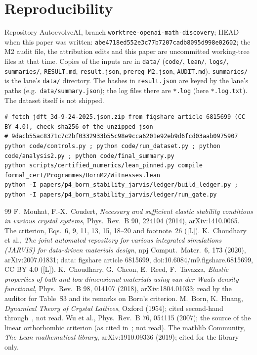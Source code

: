 \documentclass[10pt]{article}
\newcommand{\tier}[1]{\textsf{[#1]}}
\newcommand{\tL}{\tier{L}}
\begin{document}
\section{Reproducibility}\label{sec:repro}
Repository AutoevolveAI, branch \texttt{worktree-openai-math-discovery}; HEAD when this paper was written: \texttt{abe4718ed552e3c77b7207cadb8095d998e02602}; the M2 audit file, the attribution edits and this paper are uncommitted working-tree files at that time. Copies of the inputs are in \texttt{data/} (\texttt{code/}, \texttt{lean/}, \texttt{logs/}, \texttt{summaries/}, \texttt{RESULT.md}, \texttt{result.json}, \texttt{prereg\_M2.json}, \texttt{AUDIT.md}). \texttt{summaries/} is the lane's \texttt{data/} directory. The hashes in \texttt{result.json} are keyed by the lane's paths (e.g.\ \texttt{data/summary.json}); the log files there are \texttt{*.log} (here \texttt{*.log.txt}). The dataset itself is not shipped.
\begin{lstlisting}[basicstyle=\ttfamily\scriptsize]
# fetch jdft_3d-9-24-2025.json.zip from figshare article 6815699 (CC BY 4.0), check sha256 of the unzipped json
# 9dacb55ac8371c7c2bf0332933b55c98e9cca6201e92eb9d6fcd03aab0975907
python code/controls.py ; python code/run_dataset.py ; python code/analysis2.py ; python code/final_summary.py
python scripts/certified_numerics/lean_pinned.py compile formal_cert/Programmes/BornM2/Witnesses.lean
python -I papers/p4_born_stability_jarvis/ledger/build_ledger.py ; python -I papers/p4_born_stability_jarvis/ledger/run_gate.py
\end{lstlisting}

\begin{thebibliography}{99}\small
{} F.\ Mouhat, F.-X.\ Coudert, \emph{Necessary and sufficient elastic stability conditions in various crystal systems}, Phys.\ Rev.\ B 90, 224104 (2014), arXiv:1410.0065. The criterion, Eqs.~6, 9, 11, 13, 15, 18--20 and footnote~26 (\tL).
 K.\ Choudhary et al., \emph{The joint automated repository for various integrated simulations (JARVIS) for data-driven materials design}, npj Comput.\ Mater.\ 6, 173 (2020), arXiv:2007.01831; data: figshare article 6815699, doi:10.6084/m9.figshare.6815699, CC BY 4.0 (\tL).
 K.\ Choudhary, G.\ Cheon, E.\ Reed, F.\ Tavazza, \emph{Elastic properties of bulk and low-dimensional materials using van der Waals density functional}, Phys.\ Rev.\ B 98, 014107 (2018), arXiv:1804.01033; read by the auditor for Table~S3 and its remarks on Born's criterion.
 M.\ Born, K.\ Huang, \emph{Dynamical Theory of Crystal Lattices}, Oxford (1954); cited second-hand through~\cite{mc}, not read.
 Wu et al., Phys.\ Rev.\ B 76, 054115 (2007); the source of the linear orthorhombic criterion (as cited in~\cite{mc}; not read).
 The mathlib Community, \emph{The Lean mathematical library}, arXiv:1910.09336 (2019); cited for the library only.
\end{thebibliography}
\end{document}
